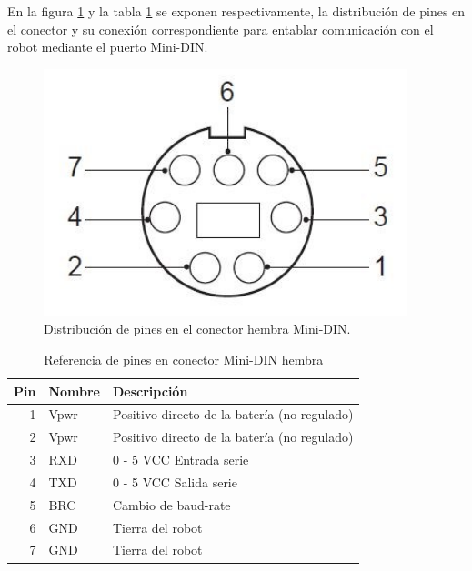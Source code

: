 En la figura \ref{fig:roombaPinout} y la tabla \ref{tab:Pines} se exponen respectivamente, la distribución de pines en el conector y su conexión correspondiente para entablar comunicación con el robot mediante el puerto Mini-DIN.

\begin{figure}[ht]
    \centering
    \includegraphics[scale=.4]{./Figures/pinout.png}
    \caption{Distribución de pines en el conector hembra Mini-DIN.}
    \label{fig:roombaPinout}
\end{figure}

\begin{table}[h]
    \centering
    \caption{Referencia de pines en conector Mini-DIN hembra}
    \label{tab:Pines}
    \begin{tabular}{rll}
        \toprule
        \multicolumn{1}{l}{Pin} & Nombre & Descripción                                  \\
        \midrule
        1                       & Vpwr   & Positivo directo de la batería (no regulado) \\
        2                       & Vpwr   & Positivo directo de la batería (no regulado) \\
        3                       & RXD    & 0 - 5 VCC Entrada serie                      \\
        4                       & TXD    & 0 - 5 VCC Salida serie                       \\
        5                       & BRC    & Cambio de baud-rate                          \\
        6                       & GND    & Tierra del robot                             \\
        7                       & GND    & Tierra del robot                             \\
        \bottomrule
    \end{tabular}
\end{table}

